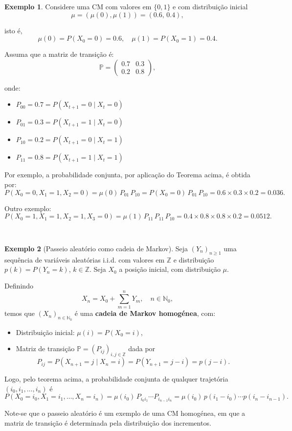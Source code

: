 \documentclass[
  11pt,
  a4paper,
]{book}
\providecommand{\tightlist}{%
  \setlength{\itemsep}{0pt}\setlength{\parskip}{0pt}}
\theoremstyle{definition}
\theoremstyle{definition}
\newtheorem{example}{Exemplo}[chapter]
\theoremstyle{definition}
\theoremstyle{definition}
\theoremstyle{remark}
\begin{document}
\begin{example}
Considere uma CM com valores em \(\{0,1\}\) e com distribuição inicial
\[
\mu = (\mu(0), \mu(1)) = (0.6, \, 0.4),
\]

isto é,
\[
\mu(0)=P(X_0=0)=0.6, \quad \mu(1)=P(X_0=1)=0.4.
\]

Assuma que a matriz de transição é:
\[
\mathbb{P} =
\begin{pmatrix}
0.7 & 0.3 \\
0.2 & 0.8
\end{pmatrix},
\]

onde:

\begin{itemize}
\tightlist
\item
  \(P_{00}=0.7 = P(X_{t+1}=0 \mid X_t=0)\)\\
\item
  \(P_{01}=0.3 = P(X_{t+1}=1 \mid X_t=0)\)\\
\item
  \(P_{10}=0.2 = P(X_{t+1}=0 \mid X_t=1)\)\\
\item
  \(P_{11}=0.8 = P(X_{t+1}=1 \mid X_t=1)\)
\end{itemize}

Por exemplo, a probabilidade conjunta, por aplicação do Teorema acima, é obtida por:
\[
P(X_0=0, X_1=1, X_2=0)
= \mu(0)\, P_{01}\, P_{10}
= P(X_0=0)\, P_{01}\, P_{10}
= 0.6 \times 0.3 \times 0.2
= 0.036.
\]

Outro exemplo:
\[
P(X_0=1, X_1=1, X_2=1, X_3=0)
= \mu(1)\, P_{11}\, P_{11}\, P_{10}
= 0.4 \times 0.8 \times 0.8 \times 0.2
= 0.0512.
\]
\end{example}

\(\,\)

\begin{example}[Passeio aleatório como cadeia de Markov]
Seja \((Y_n)_{n \ge 1}\) uma sequência de variáveis aleatórias i.i.d. com valores em \(\mathbb{Z}\) e distribuição \(p(k) = P(Y_n = k)\), \(k \in \mathbb{Z}\). Seja \(X_0\) a posição inicial, com distribuição \(\mu\).

Definindo
\[
X_n = X_0 + \sum_{m=1}^n Y_m, \quad n \in \mathbb{N}_0,
\]
temos que \((X_n)_{n \in \mathbb{N}_0}\) é uma \textbf{cadeia de Markov homogénea}, com:

\begin{itemize}
\tightlist
\item
  Distribuição inicial: \(\mu(i) = P(X_0 = i)\),\\
\item
  Matriz de transição \(\mathbb{P} = (P_{ij})_{i,j \in \mathbb{Z}}\) dada por
  \[
  P_{ij} = P(X_{n+1} = j \mid X_n = i) = P(Y_{n+1} = j-i) = p(j-i).
  \]
\end{itemize}

Logo, pelo teorema acima, a probabilidade conjunta de qualquer trajetória \((i_0, i_1, \dots, i_n)\) é
\[
P(X_0=i_0, X_1=i_1, \dots, X_n=i_n)
= \mu(i_0) \, P_{i_0 i_1} \cdots P_{i_{n-1} i_n}
= \mu(i_0) \, p(i_1-i_0) \cdots p(i_n - i_{n-1}).
\]

Note-se que o passeio aleatório é um exemplo de uma CM homogénea, em que a matriz de transição é determinada pela distribuição dos incrementos.
\end{example}
\end{document}
